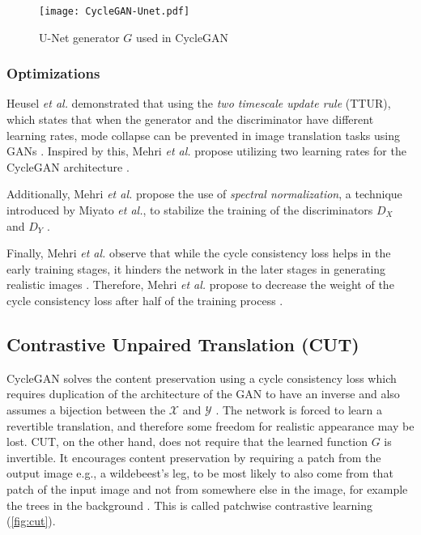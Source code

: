 \documentclass[a4paper,11pt, DIV=12]{scrartcl}
\begin{document}
\begin{figure}[h]
   \texttt{[image: CycleGAN-Unet.pdf]}
   \caption{U-Net generator $G$ used in CycleGAN \cite{unet,mehri2019colorizing}}
   \label{fig:unet}
\end{figure}

\subsubsection*{Optimizations}
Heusel \textit{et al.} demonstrated that using the \textit{two timescale update rule} (TTUR), which states that when the generator and the discriminator have different learning rates,
mode collapse can be prevented in image translation tasks using GANs \cite{ttur}.
Inspired by this, Mehri \textit{et al.} propose utilizing two learning rates for the CycleGAN architecture \cite{mehri2019colorizing}.

Additionally, Mehri \textit{et al.} propose the use of \textit{spectral normalization}, a technique introduced by Miyato \textit{et al.}, to stabilize the training of the discriminators $D_X$ and $D_Y$ \cite{spectral_norm, mehri2019colorizing}.

Finally, Mehri \textit{et al.} observe that while the cycle consistency loss helps in the early training stages, it hinders the network in the later stages in generating realistic images \cite{mehri2019colorizing}.
Therefore, Mehri \textit{et al.} propose to decrease the weight of the cycle consistency loss after half of the training process \cite{mehri2019colorizing}.

\subsection{Contrastive Unpaired Translation (CUT)}
CycleGAN solves the content preservation using a cycle consistency loss which requires duplication of the architecture
of the GAN to have an inverse and also assumes a bijection between the $\mathcal{X}$ and $\mathcal{Y}$ \cite{cyclegan_orig}.
The network is forced to learn a revertible translation, and therefore some freedom for realistic appearance may be lost.
CUT, on the other hand, does not require that the learned function $G$ is invertible.
It encourages content preservation by requiring a patch from the output image e.g., a wildebeest's leg, to be most likely to also come from that patch
of the input image and not from somewhere else in the image, for example the trees in the background \cite{cut}. This is called patchwise contrastive learning (\autoref{fig:cut}).
\end{document}
